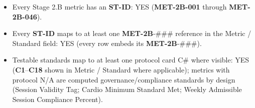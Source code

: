 \documentclass[10pt]{article}
\begin{document}
\begin{itemize}
\item Every Stage 2.B metric has an \textbf{ST-ID}: YES (\textbf{MET-2B-001} through \textbf{MET-2B-046}).
\item Every \textbf{ST-ID} maps to at least one \textbf{MET-2B}-\#\#\# reference in the Metric / Standard field: YES (every row embeds its \textbf{MET-2B}-\#\#\#).
\item Testable standards map to at least one protocol card C\# where visible: YES (\textbf{C1}–\textbf{C18} shown in Metric / Standard where applicable); metrics with protocol N/A are computed governance/compliance standards by design (Session Validity Tag; Cardio Minimum Standard Met; Weekly Admissible Session Compliance Percent).
\end{itemize}
\end{document}
